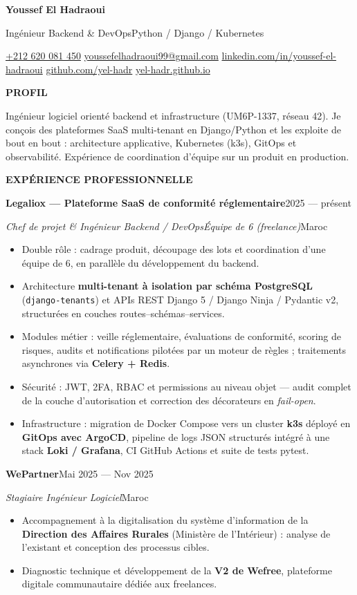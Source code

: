 \documentclass[10pt,a4paper]{article}
\makeatletter
\newcommand{\dotsep}{\enspace\textbullet\enspace}
\newcommand{\contactsep}{\enspace{\color{faint}\textbf{|}}\enspace}
\newcommand{\Header}[1]{%
  {\centering
    {\fontsize{24.8}{28}\selectfont\bfseries\color{accent}Youssef El Hadraoui}\par
    \vspace{4pt}
    {\sffamily\fontsize{8.25}{10}\selectfont\color{muted}#1}\par
    \vspace{9pt}
    {\footnotesize\color{muted}%
      \href{tel:+212620081450}{+212 620 081 450}\contactsep
      \href{mailto:youssefelhadraoui99@gmail.com}{youssefelhadraoui99@gmail.com}\contactsep
      \href{https://linkedin.com/in/youssef-el-hadraoui}{linkedin.com/in/youssef-el-hadraoui}\contactsep
      \href{https://github.com/yel-hadr}{github.com/yel-hadr}\contactsep
      \href{https://yel-hadr.github.io}{yel-hadr.github.io}}\par}
  \vspace{4pt}}
\newcommand{\Section}[1]{%
  \par\vspace{7pt}
  {\sffamily\bfseries\fontsize{7.33}{9}\selectfont\color{accent}\MakeUppercase{#1}}\par
  \vspace{1pt}{\color{faint}\hrule height 0.4pt}\vspace{5pt}}
\newcommand{\Entry}[4]{%
  \par\vspace{3pt}
  {\bfseries #1}\hfill{\small\color{muted}#2}\par
  \vspace{1pt}
  {\small\itshape\color{accent}#3}\hfill{\small\color{muted}#4}\par}
\makeatother
\begin{document}
\Header{Ingénieur Backend \& DevOps\dotsep Python / Django / Kubernetes}

\Section{Profil}
Ingénieur logiciel orienté backend et infrastructure (UM6P-1337, réseau 42). Je conçois des
plateformes SaaS multi-tenant en Django/Python et les exploite de bout en bout : architecture
applicative, Kubernetes (k3s), GitOps et observabilité. Expérience de coordination d'équipe sur un
produit en production.

\Section{Expérience professionnelle}
\Entry{Legaliox --- Plateforme SaaS de conformité réglementaire}{2025 --- présent}
  {Chef de projet \& Ingénieur Backend / DevOps\dotsep Équipe de 6 (freelance)}{Maroc}
\begin{itemize}
  \item Double rôle : cadrage produit, découpage des lots et coordination d'une équipe de 6, en
    parallèle du développement du backend.
  \item Architecture \textbf{multi-tenant à isolation par schéma PostgreSQL}
    (\texttt{django-tenants}) et APIs REST Django 5 / Django Ninja / Pydantic v2, structurées en
    couches routes--schémas--services.
  \item Modules métier : veille réglementaire, évaluations de conformité, scoring de risques, audits
    et notifications pilotées par un moteur de règles ; traitements asynchrones via
    \textbf{Celery + Redis}.
  \item Sécurité : JWT, 2FA, RBAC et permissions au niveau objet --- audit complet de la couche
    d'autorisation et correction des décorateurs en \textit{fail-open}.
  \item Infrastructure : migration de Docker Compose vers un cluster \textbf{k3s} déployé en
    \textbf{GitOps avec ArgoCD}, pipeline de logs JSON structurés intégré à une stack
    \textbf{Loki / Grafana}, CI GitHub Actions et suite de tests pytest.
\end{itemize}

\Entry{WePartner}{Mai 2025 --- Nov 2025}{Stagiaire Ingénieur Logiciel}{Maroc}
\begin{itemize}
  \item Accompagnement à la digitalisation du système d'information de la \textbf{Direction des
    Affaires Rurales} (Ministère de l'Intérieur) : analyse de l'existant et conception des processus
    cibles.
  \item Diagnostic technique et développement de la \textbf{V2 de Wefree}, plateforme digitale
    communautaire dédiée aux freelances.
\end{itemize}
\end{document}
